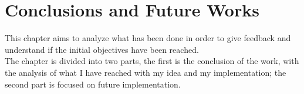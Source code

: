 %
%
\chapter{Conclusions and Future Works}
%
\label{cap:conclusions}
%
%
This chapter aims to analyze what has been done in order to give feedback
and understand if the initial objectives have been reached.\\
The chapter is divided into two parts, the first is the conclusion of the work, with
the analysis of what I have reached with my idea and my implementation; the
second part is focused on future implementation.
